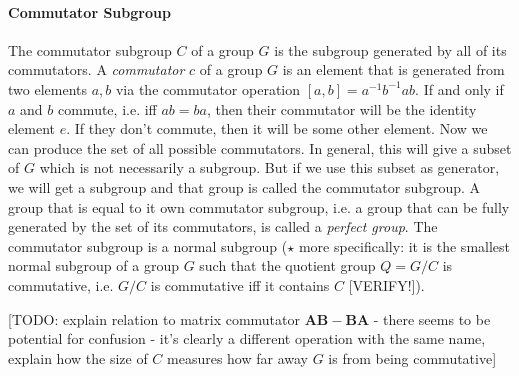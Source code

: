 \paragraph{Commutator Subgroup} The commutator subgroup $C$ of a group $G$ is the subgroup generated by all of its commutators. A \emph{commutator} $c$ of a group $G$ is an element that is generated from two elements $a,b$ via the commutator operation $[a,b] = a^{-1} b^{-1} a b$. If and only if $a$ and $b$ commute, i.e. iff $ab = ba$, then their commutator will be the identity element $e$. If they don't commute, then it will be some other element. Now we can produce the set of all possible commutators. In general, this will give a subset of $G$ which is not necessarily a subgroup. But if we use this subset as generator, we will get a subgroup and that group is called the commutator subgroup. A group that is equal to it own commutator subgroup, i.e. a group that can be fully generated by the set of its commutators, is called a \emph{perfect group}. The commutator subgroup is a normal subgroup ($\star$ more specifically: it is the smallest normal subgroup of a group $G$ such that the quotient group $Q = G / C$ is commutative, i.e. $G/C$ is commutative iff it contains $C$ [VERIFY!]).


[TODO: explain relation to matrix commutator $\mathbf{AB - BA}$ - there seems to be potential for confusion - it's clearly a different operation with the same name, explain how the size of $C$ measures how far away $G$ is from being commutative]





